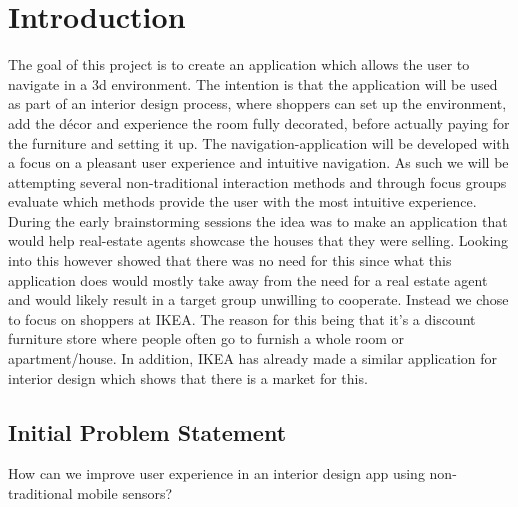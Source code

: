 \chapter{Introduction}
The goal of this project is to create an application which allows the user to navigate in a 3d environment. The intention is that the application will be used as part of an interior design process, where shoppers can set up the environment, add the décor and experience the room fully decorated, before actually paying for the furniture and setting it up.
The navigation-application will be developed with a focus on a pleasant user experience and intuitive navigation. As such we will be attempting several non-traditional interaction methods and through focus groups evaluate which methods provide the user with the most intuitive experience. 
During the early brainstorming sessions the idea was to make an application that would help real-estate agents showcase the houses that they were selling. Looking into this however showed that there was no need for this since what this application does would mostly take away from the need for a real estate agent and would likely result in a target group unwilling to cooperate. Instead we chose to focus on shoppers at IKEA. The reason for this being that it's a discount furniture store where people often go to furnish a whole room or apartment/house.
In addition, IKEA has already made a similar application for interior design which shows that there is a market for this.
 
\section{Initial Problem Statement}
How can we improve user experience in an interior design app using non-traditional mobile sensors?
